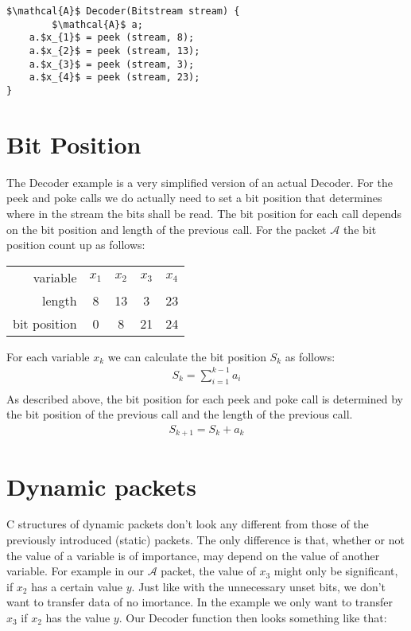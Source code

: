 \documentclass[parskip=half,paper=a4,DIV=13]{scrartcl}
\begin{document}
\begin{lstlisting}[mathescape]
$\mathcal{A}$ Decoder(Bitstream stream) {
        $\mathcal{A}$ a;
	a.$x_{1}$ = peek (stream, 8);
	a.$x_{2}$ = peek (stream, 13);
	a.$x_{3}$ = peek (stream, 3);
	a.$x_{4}$ = peek (stream, 23);
}
\end{lstlisting}

\section{Bit Position}

The Decoder example is a very simplified version of an actual Decoder.
For the peek and poke calls we do actually need to set a bit position
that determines where in the stream the bits shall be read.
The bit position for each call depends on the bit position and length of the previous call.
For the packet $\mathcal{A}$ the bit position count up as follows:\\
\begin{center}
\begin{tabular}{r | cccc}
	variable &$x_{1}$ &$x_{2}$ &$x_{3}$ &$x_{4}$\\
	length &8 &13 &3 &23\\
	bit position &0 &8 &21 &24
\end{tabular}
\end{center}
For each variable $x_{k}$ we can calculate the bit position $S_{k}$ as follows:
\begin{align*}
	S_{k} = \sum_{i=1}^{k-1} a_{i}\\
\end{align*}
As described above, the bit position for each peek and poke call is determined by
the bit position of the previous call and the length of the previous call.
\begin{align*}
	S_{k+1} = S_{k} + a_{k}
\end{align*}
\section{Dynamic packets}

C structures of dynamic packets don't look any different from those of the previously introduced (static) packets.
The only difference is that, whether or not the value of a variable is of importance, may depend on the value of another variable.
For example in our $\mathcal{A}$ packet, the value of $x_{3}$ might only be significant, if $x_{2}$ has a certain value $y$.
Just like with the unnecessary unset bits, we don't want to transfer data of no imortance.
In the example we only want to transfer $x_{3}$ if $x_{2}$ has the value $y$.
Our Decoder function then looks something like that:
\end{document}
